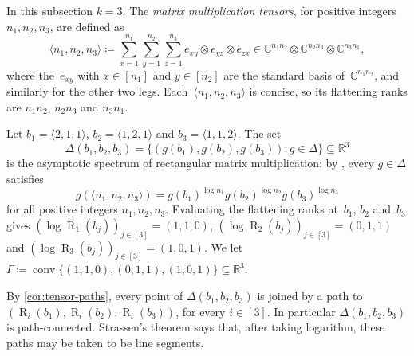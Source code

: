 \documentclass[11pt,letterpaper]{article}
\DeclareMathOperator{\tensorrank}{R}
\newcommand{\RR}{\mathbb{R}}
\newcommand{\CC}{\mathbb{C}}
\DeclareMathOperator{\conv}{conv}
\begin{document}
In this subsection $k = 3$. The \emph{matrix multiplication tensors}, for positive integers $n_1, n_2, n_3$, are defined as 
\begin{equation}\label{eq:mm-tensor}
\langle n_1, n_2, n_3 \rangle \coloneqq \sum_{x=1}^{n_1} \sum_{y=1}^{n_2} \sum_{z=1}^{n_3} e_{xy} \otimes e_{yz} \otimes e_{zx}  \in \CC^{n_1 n_2} \otimes \CC^{n_2 n_3} \otimes \CC^{n_3 n_1},
\end{equation}
where the~$e_{xy}$ with $x \in [n_1]$ and $y \in [n_2]$ are the standard basis of~$\CC^{n_1 n_2}$, and similarly for the other two legs. 
Each~$\langle n_1, n_2, n_3 \rangle$ is concise, so its flattening ranks are $n_1 n_2$, $n_2 n_3$ and $n_3 n_1$. 

Let $b_1 = \langle 2,1,1 \rangle$, $b_2 = \langle 1,2,1 \rangle$ and $b_3 = \langle 1,1,2 \rangle$. 
The set
\[
\Delta(b_1,b_2,b_3) = \{ (g(b_1), g(b_2), g(b_3)) : g \in \Delta \} \subseteq \RR^3
\]
is the asymptotic spectrum of rectangular matrix multiplication: by \cite[Proposition~4.3]{strassen1988asymptotic}, every $g \in \Delta$ satisfies
\[
g(\langle n_1, n_2, n_3 \rangle) = g(b_1)^{\log n_1} g(b_2)^{\log n_2} g(b_3)^{\log n_3}
\]
for all positive integers $n_1, n_2, n_3$. Evaluating the flattening ranks at~$b_1$, $b_2$ and~$b_3$ gives $(\log \tensorrank_1(b_j))_{j \in [3]} = (1,1,0)$, $(\log \tensorrank_2(b_j))_{j \in [3]} = (0,1,1)$ and $(\log \tensorrank_3(b_j))_{j \in [3]} = (1,0,1)$. We let $\Gamma \coloneqq \conv\{(1,1,0), (0,1,1), (1,0,1)\} \subseteq \RR^3$.

By \cref{cor:tensor-paths}, every point of $\Delta(b_1,b_2,b_3)$ is joined by a path to $(\tensorrank_i(b_1), \tensorrank_i(b_2), \tensorrank_i(b_3))$, for every $i \in [3]$. In particular $\Delta(b_1,b_2,b_3)$ is path-connected. Strassen's theorem says that, after taking logarithm, these paths may be taken to be line segments. 
\end{document}
